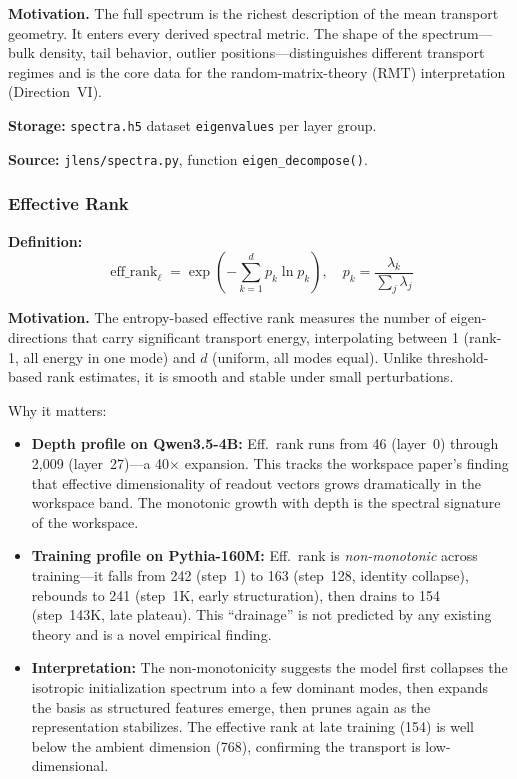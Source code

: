 \documentclass[11pt,a4paper]{article}
\begin{document}
\textbf{Motivation.} The full spectrum is the richest description of the mean transport geometry. It enters every derived spectral metric. The shape of the spectrum---bulk density, tail behavior, outlier positions---distinguishes different transport regimes and is the core data for the random-matrix-theory (RMT) interpretation (Direction~VI).

\textbf{Storage:} \texttt{spectra.h5} dataset \texttt{eigenvalues} per layer group.

\textbf{Source:} \texttt{jlens/spectra.py}, function \texttt{eigen\_decompose()}.

\subsubsection{Effective Rank}
\label{sec:eff_rank}

\textbf{Definition:}
\begin{equation}
  \operatorname{eff\_rank}_\ell = \exp\!\left(-\sum_{k=1}^d p_k \ln p_k\right), \quad
  p_k = \frac{\lambda_k}{\sum_j \lambda_j}
\end{equation}

\textbf{Motivation.} The entropy-based effective rank measures the number of eigen-directions that carry significant transport energy, interpolating between 1 (rank-1, all energy in one mode) and $d$ (uniform, all modes equal). Unlike threshold-based rank estimates, it is smooth and stable under small perturbations.

Why it matters:
\begin{itemize}
  \item \textbf{Depth profile on Qwen3.5-4B:} Eff.\ rank runs from 46 (layer~0) through 2,009 (layer~27)---a 40$\times$ expansion. This tracks the workspace paper's finding that effective dimensionality of readout vectors grows dramatically in the workspace band. The monotonic growth with depth is the spectral signature of the workspace.
  \item \textbf{Training profile on Pythia-160M:} Eff.\ rank is \emph{non-monotonic} across training---it falls from 242 (step~1) to 163 (step~128, identity collapse), rebounds to 241 (step~1K, early structuration), then drains to 154 (step~143K, late plateau). This ``drainage'' is not predicted by any existing theory and is a novel empirical finding.
  \item \textbf{Interpretation:} The non-monotonicity suggests the model first collapses the isotropic initialization spectrum into a few dominant modes, then expands the basis as structured features emerge, then prunes again as the representation stabilizes. The effective rank at late training (154) is well below the ambient dimension (768), confirming the transport is low-dimensional.
\end{itemize}
\end{document}
